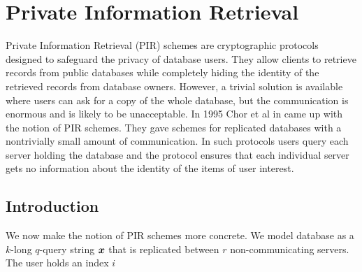 \section{Private Information Retrieval}
Private Information Retrieval (PIR) schemes are cryptographic protocols designed to safeguard the privacy of database users. They allow clients to retrieve records from public databases while completely hiding the identity of the retrieved records from database owners.  However, a trivial solution is available where users can ask for a copy of the whole database, but the communication is enormous and is likely to be unacceptable. In 1995 Chor et al in \cite{ChorGoldreichKushilevitzSudan__Pir_CONF} came up with the notion of PIR schemes. They gave schemes for  replicated databases with a nontrivially small amount of communication. In such protocols users query each server holding the database and the protocol ensures that each individual server gets no information about the identity of the items of user interest. 

\subsection{Introduction}
We now make the notion of PIR schemes more concrete. We model database as a $k$-long $q$-query string $\boldsymbol{x}$ that is replicated between $r$ non-communicating servers. The user holds an index $i$